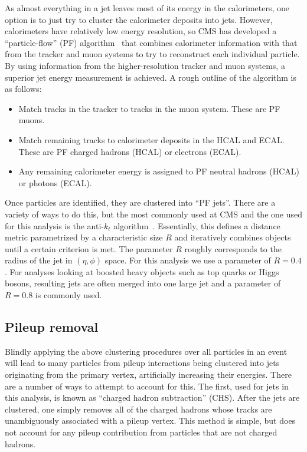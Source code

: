 As almost everything in a jet leaves
most of its energy in the calorimeters, 
one option is to just try to cluster the
calorimeter deposits into jets. However, calorimeters
have relatively low energy resolution, so CMS has developed
a ``particle-flow'' (PF) algorithm~\cite{CMS:pf} that combines calorimeter
information with that from the tracker and muon systems
to try to reconstruct each individual particle.
By using information from the higher-resolution tracker
and muon systems, a superior jet energy measurement is achieved.
A rough outline of the algorithm is as follows:
\begin{itemize}\setlength\itemsep{-1mm}
\item Match tracks in the tracker to tracks in the muon system.
These are PF muons.
\item Match remaining tracks to calorimeter deposits in the HCAL
and ECAL. These are PF charged hadrons (HCAL) or electrons (ECAL).
\item Any remaining calorimeter energy is assigned to 
PF neutral hadrons (HCAL) or photons (ECAL).
\end{itemize}

Once particles are identified, they are clustered into ``PF jets''.
There are a variety of ways to do this, but the most commonly used
at CMS and the one used for this analysis is the anti-$k_t$
algorithm~\cite{Cacciari:antikt}. Essentially, this defines a distance metric
parametrized by a characteristic size $R$ and iteratively combines objects
until a certain criterion is met. The parameter $R$ roughly corresponds
to the radius of the jet in $(\eta,\phi)$ space. For this analysis we use
a parameter of $R=0.4$. For analyses looking at boosted heavy objects
such as top quarks or Higgs bosons, resulting jets are often merged
into one large jet and a parameter of $R=0.8$ is commonly used.

\subsection{Pileup removal}
Blindly applying the above clustering procedures
over all particles in an event will lead to many particles from
pileup interactions being clustered into jets originating from
the primary vertex, artificially increasing their energies.
There are a number of ways to attempt to account for this.
The first, used for jets in this analysis, is known
as ``charged hadron subtraction'' (CHS). After the jets
are clustered, one simply removes all of the charged hadrons
whose tracks are unambiguously associated with a pileup vertex.
This method is simple, but does not account for any pileup contribution
from particles that are not charged hadrons.

